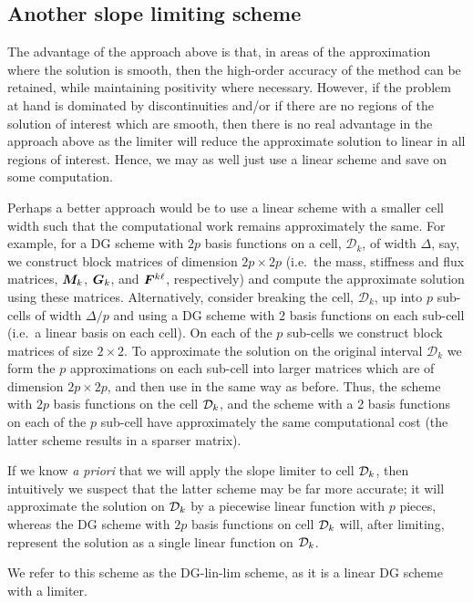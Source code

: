 \subsection{Another slope limiting scheme}\label{sec: anoth pos pres}
The advantage of the approach above is that, in areas of the approximation where the solution is smooth, then the high-order accuracy of the method can be retained, while maintaining positivity where necessary. However, if the problem at hand is dominated by discontinuities and/or if there are no regions of the solution of interest which are smooth, then there is no real advantage in the approach above as the limiter will reduce the approximate solution to linear in all regions of interest. Hence, we may as well just use a linear scheme and save on some computation. 

Perhaps a better approach would be to use a linear scheme with a smaller cell width such that the computational work remains approximately the same. For example, for a DG scheme with \(2p\) basis functions on a cell, \(\mathcal D_k\), of width \(\Delta\), say, we construct block matrices of dimension \(2p\times 2p\) (i.e.~the mass, stiffness and flux matrices, \(\boldsymbol M_k\), \(\boldsymbol G_k\), and \(\boldsymbol F^{k\ell}\), respectively) and compute the approximate solution using these matrices. Alternatively, consider breaking the cell, \(\mathcal D_k\), up into \(p\) sub-cells of width \(\Delta/p\) and using a DG scheme with \(2\) basis functions on each sub-cell (i.e.~a linear basis on each cell). On each of the \(p\) sub-cells we construct block matrices of size \(2\times 2\). To approximate the solution on the original interval \(\mathcal D_k\) we form the \(p\) approximations on each sub-cell into larger matrices which are of dimension \(2p\times 2p\), and then use in the same way as before. Thus, the scheme with \(2p\) basis functions on the cell \(\mathcal{D}_k\), and the scheme with a 2 basis functions on each of the \(p\) sub-cell have approximately the same computational cost (the latter scheme results in a sparser matrix). 

If we know \emph{a priori} that we will apply the slope limiter to cell \(\mathcal{D}_k\), then intuitively we suspect that the latter scheme may be far more accurate; it will approximate the solution on \(\mathcal{D}_k\) by a piecewise linear function with \(p\) pieces, whereas the DG scheme with \(2p\) basis functions on cell \(\mathcal{D}_k\) will, after limiting, represent the solution as a single linear function on \(\mathcal{D}_k\). 

We refer to this scheme as the DG-lin-lim scheme, as it is a linear DG scheme with a limiter.

